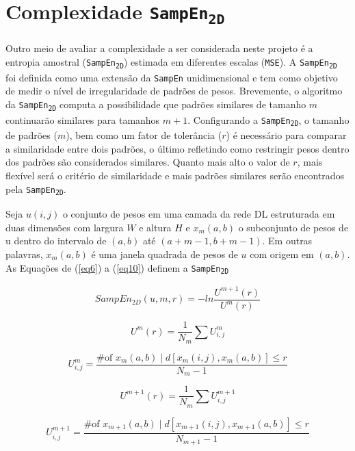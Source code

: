 \documentclass[
	12pt,				%
	openany,oneside,
	a4paper,			%
	english,			%
	brazil,				%
	]{abntex2}
\begin{document}
\section{Complexidade \texttt{SampEn\textsubscript{2D}}}
Outro meio de avaliar a complexidade a ser considerada neste projeto é a entropia amostral (\texttt{SampEn\textsubscript{2D}}) estimada em diferentes escalas (\texttt{MSE}). A \texttt{SampEn\textsubscript{2D}} foi definida como uma extensão da \texttt{SampEn} unidimensional e tem como objetivo de medir o nível de irregularidade de padrões de pesos. Brevemente, o algoritmo da \texttt{SampEn\textsubscript{2D}} computa a possibilidade que padrões similares de tamanho $m$ continuarão similares para tamanhos $m+1$. Configurando a \texttt{SampEn\textsubscript{2D}}, o tamanho de padrões ($m$), bem como um fator de tolerância ($r$) é necessário para comparar a similaridade entre dois padrões, o último refletindo como restringir pesos dentro dos padrões são considerados similares. Quanto mais alto o valor de $r$, mais flexível será o critério de similaridade e mais padrões similares serão encontrados pela \texttt{SampEn\textsubscript{2D}}.

Seja $u(i, j)$ o conjunto de pesos em uma camada da rede DL estruturada em duas dimensões com largura $W$ e altura $H$ e $x_m (a, b)$ o subconjunto de pesos de u dentro do intervalo de $(a,b)$ até $(a + m-1, b + m-1)$. Em outras palavras, $x_m (a, b)$ é uma janela quadrada de pesos de $u$ com origem em $(a,b)$. As Equações de (\ref{eq6}) a (\ref{eq10}) definem a \texttt{SampEn\textsubscript{2D}}

\begin{equation}
\label{eq6}
SampEn_{2D}(u, m, r) = - ln \frac{U^{m+1}(r)}{U^m(r)}
\end{equation}

\begin{equation}
\label{eq7}
U^m(r) = \frac{1}{N_m}\sum U^m_{i,j}
\end{equation}

\begin{equation}
\label{eq8}
U^m_{i,j} = \frac{\text{\# of }x_m(a,b) \; | \; d[x_m(i,j), x_m(a,b) ] \leq r   }{N_m - 1}
\end{equation}

\begin{equation}
\label{eq9}
U^{m+1}(r) = \frac{1}{N_m} \sum U^{m+1}_{i,j}
\end{equation}

\begin{equation}
\label{eq10}
U^{m+1}_{i,j} = \frac{\text{\# of }x_{m+1}(a,b) \; | \; d[x_{m+1}(i,j), x_{m+1}(a,b) ] \leq r   }{N_{m+1} - 1}
\end{equation}
\end{document}
